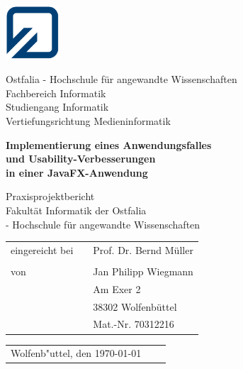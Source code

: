 
\begin{titlepage}

	\thispagestyle{empty}
	
	\begin{minipage}{2.1cm}
		\includegraphics[width=2cm]{grafiken/fh_logo_klein.jpg}
	\end{minipage}
	\begin{minipage}{10.0cm}
		Ostfalia - Hochschule für angewandte Wissenschaften\\
		Fachbereich Informatik\\
		Studiengang Informatik\\
		Vertiefungsrichtung Medieninformatik
	\end{minipage}

	\vspace{15mm}

	\begin{center}
		\LARGE \textbf{Implementierung eines Anwendungsfalles \\und Usability-Verbesserungen \\in einer JavaFX-Anwendung\\[10mm]}
	\end{center}
	
	\begin{center}
		\normalsize Praxisprojektbericht\\[1cm]
		Fakultät Informatik der Ostfalia \\
		- Hochschule für angewandte Wissenschaften\\[10mm]
	\end{center}

	\begin{table}[h]
		\centering
		\begin{tabular}{lcl}
			eingereicht bei &  &Prof. Dr. Bernd Müller\\
			& & \\
			von & & Jan Philipp Wiegmann\\
			& & Am Exer 2\\
			& & 38302 Wolfenbüttel\\
			& & Mat.-Nr. 70312216\\
		\end{tabular}
	\end{table}

	\vspace{20mm}

	\begin{table}[h]
		\begin{tabular}{lll}
			Wolfenb"uttel, den \today\\
		\end{tabular}
	\end{table}

\end{titlepage}
